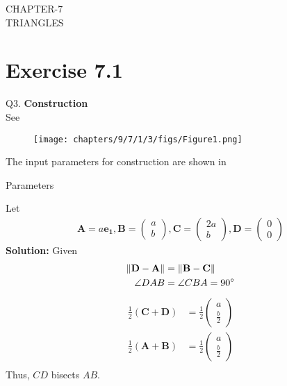 \documentclass{article}
\providecommand{\norm}[1]{\left\lVert#1\right\rVert}
\newcommand{\solution}{\noindent \textbf{Solution: }}
\newcommand{\myvec}[1]{\ensuremath{\begin{pmatrix}#1\end{pmatrix}}}
\let\vec\mathbf
\begin{document}
\begin{center}
        \textbf\large{CHAPTER-7 \\ TRIANGLES}
\end{center}
\section{Exercise 7.1}
Q3. 
\textbf{Construction}\\
\fi
See 
\begin{figure}[H]
	\begin{center}
		\texttt{[image: chapters/9/7/1/3/figs/Figure1.png]}
	\end{center}
	\caption{}
	\label{fig:chapters/9/7/1/3/Fig1}
\end{figure}
The input parameters for construction are shown in 
\begin{table}[H]
	  \centering
	  
	  \caption{Parameters}
	  \label{tab:chapters/9/7/1/3/Table1}
\end{table}
Let
\begin{align}
	\vec{A} = a\vec{e_1},\vec{B} = \myvec{a\\b},\vec{C} = \myvec{2a\\b},\vec{D} = \myvec{0\\0}
\end{align}
\solution
Given
\begin{align}
	\norm{\vec{D}-\vec{A}}&=\norm{\vec{B}-\vec{C}}
	\\
	\angle DAB &= \angle CBA=90\degree
\end{align}
\begin{align}
	\frac{1}{2}(\vec{C}+\vec{D}) &= \frac{1}{2}\myvec{a \\ \frac{b}{2}}
	\\
	\frac{1}{2}(\vec{A}+\vec{B}) &= \frac{1}{2}\myvec{a \\ \frac{b}{2}}
		 \label{eq:chapters/9/7/1/3/1}\\
\end{align}
Thus, $CD$ bisects $AB$.
\end{document}
